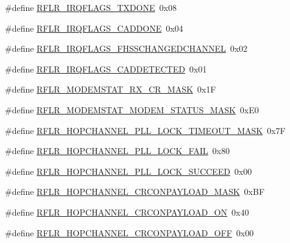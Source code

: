 \begin{DoxyCompactItemize}
\#define \hyperlink{sx1276Regs-LoRa_8h_a15a27d43d8ec6b82bcd31857c35e9f09}{R\+F\+L\+R\+\_\+\+I\+R\+Q\+F\+L\+A\+G\+S\+\_\+\+T\+X\+D\+O\+NE}~0x08
\item 
\#define \hyperlink{sx1276Regs-LoRa_8h_a44fee83993ca42bbd77370fc82c2fc91}{R\+F\+L\+R\+\_\+\+I\+R\+Q\+F\+L\+A\+G\+S\+\_\+\+C\+A\+D\+D\+O\+NE}~0x04
\item 
\#define \hyperlink{sx1276Regs-LoRa_8h_a781c17401f3c0f94e56cd76d43ca0271}{R\+F\+L\+R\+\_\+\+I\+R\+Q\+F\+L\+A\+G\+S\+\_\+\+F\+H\+S\+S\+C\+H\+A\+N\+G\+E\+D\+C\+H\+A\+N\+N\+EL}~0x02
\item 
\#define \hyperlink{sx1276Regs-LoRa_8h_a301a9870f807e6c4f54ad608da0549ed}{R\+F\+L\+R\+\_\+\+I\+R\+Q\+F\+L\+A\+G\+S\+\_\+\+C\+A\+D\+D\+E\+T\+E\+C\+T\+ED}~0x01
\item 
\#define \hyperlink{sx1276Regs-LoRa_8h_af3688cb4f2ac1d6fe5669af690e813ed}{R\+F\+L\+R\+\_\+\+M\+O\+D\+E\+M\+S\+T\+A\+T\+\_\+\+R\+X\+\_\+\+C\+R\+\_\+\+M\+A\+SK}~0x1F
\item 
\#define \hyperlink{sx1276Regs-LoRa_8h_af57dfdb07c9b3873afb53a91443b0565}{R\+F\+L\+R\+\_\+\+M\+O\+D\+E\+M\+S\+T\+A\+T\+\_\+\+M\+O\+D\+E\+M\+\_\+\+S\+T\+A\+T\+U\+S\+\_\+\+M\+A\+SK}~0x\+E0
\item 
\#define \hyperlink{sx1276Regs-LoRa_8h_a9b65f0f8d357147986b31a6c668868fb}{R\+F\+L\+R\+\_\+\+H\+O\+P\+C\+H\+A\+N\+N\+E\+L\+\_\+\+P\+L\+L\+\_\+\+L\+O\+C\+K\+\_\+\+T\+I\+M\+E\+O\+U\+T\+\_\+\+M\+A\+SK}~0x7F
\item 
\#define \hyperlink{sx1276Regs-LoRa_8h_a5585b4aec7b248eb33ae15ba12b6d91a}{R\+F\+L\+R\+\_\+\+H\+O\+P\+C\+H\+A\+N\+N\+E\+L\+\_\+\+P\+L\+L\+\_\+\+L\+O\+C\+K\+\_\+\+F\+A\+IL}~0x80
\item 
\#define \hyperlink{sx1276Regs-LoRa_8h_aee5274333f27229f37276e92627fe9d0}{R\+F\+L\+R\+\_\+\+H\+O\+P\+C\+H\+A\+N\+N\+E\+L\+\_\+\+P\+L\+L\+\_\+\+L\+O\+C\+K\+\_\+\+S\+U\+C\+C\+E\+ED}~0x00
\item 
\#define \hyperlink{sx1276Regs-LoRa_8h_aa8fbfece67ad9c1feabed0dc5018d1fa}{R\+F\+L\+R\+\_\+\+H\+O\+P\+C\+H\+A\+N\+N\+E\+L\+\_\+\+C\+R\+C\+O\+N\+P\+A\+Y\+L\+O\+A\+D\+\_\+\+M\+A\+SK}~0x\+BF
\item 
\#define \hyperlink{sx1276Regs-LoRa_8h_ab93bd7b9eac440324cb3e24bd123af06}{R\+F\+L\+R\+\_\+\+H\+O\+P\+C\+H\+A\+N\+N\+E\+L\+\_\+\+C\+R\+C\+O\+N\+P\+A\+Y\+L\+O\+A\+D\+\_\+\+ON}~0x40
\item 
\#define \hyperlink{sx1276Regs-LoRa_8h_a1355316824e22da44242051ef2e802cd}{R\+F\+L\+R\+\_\+\+H\+O\+P\+C\+H\+A\+N\+N\+E\+L\+\_\+\+C\+R\+C\+O\+N\+P\+A\+Y\+L\+O\+A\+D\+\_\+\+O\+FF}~0x00

\end{DoxyCompactItemize}

